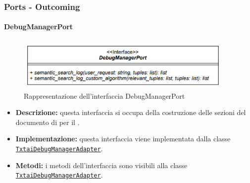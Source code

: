 \subsubsection{Ports - Outcoming}

\paragraph{DebugManagerPort} \label{DebugManagerPort}
\begin{figure}[H]
    \centering
    \includegraphics[width=0.95\textwidth]{assets/Backend/debug_manager_port.png}
    \caption{Rappresentazione dell'interfaccia DebugManagerPort}
  \end{figure}
\begin{itemize}
    \item \textbf{Descrizione:} questa interfaccia si occupa della costruzione delle sezioni del documento di  per il .
    \item \textbf{Implementazione:} questa interfaccia viene implementata dalla classe \hyperref[TxtaiDebugManagerAdapter]{\texttt{TxtaiDebugManagerAdapter}}.
    \item \textbf{Metodi:} i metodi dell'interfaccia sono visibili alla classe \hyperref[TxtaiDebugManagerAdapter]{\texttt{TxtaiDebugManagerAdapter}}.
\end{itemize}  

